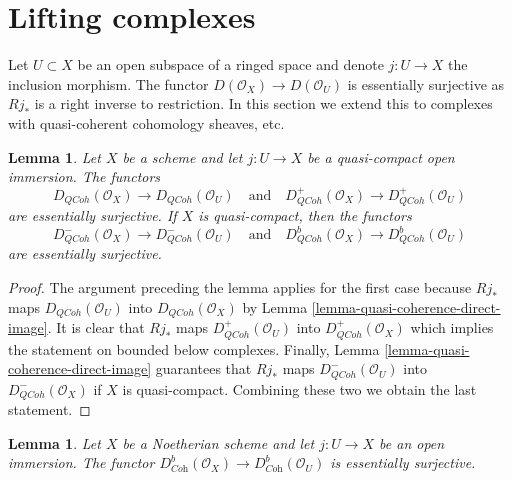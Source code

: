 \documentclass{stacks-project}
\theoremstyle{plain}
\newtheorem{lemma}[subsection]{Lemma}
\theoremstyle{definition}
\theoremstyle{remark}
\numberwithin{equation}{subsection}
\def\QCoh{\mathit{QCoh}}
\begin{document}
\section{Lifting complexes}
\label{section-lift}

\noindent
Let $U \subset X$ be an open subspace of a ringed space
and denote $j : U \to X$ the inclusion morphism. The functor
$D(\mathcal{O}_X) \to D(\mathcal{O}_U)$ is essentially surjective as
$Rj_*$ is a right inverse to restriction.
In this section we extend this to complexes with quasi-coherent cohomology
sheaves, etc.

\begin{lemma}
\label{lemma-lift-quasi-coherent}
Let $X$ be a scheme and let $j : U \to X$ be a quasi-compact
open immersion. The functors
$$
D_\QCoh(\mathcal{O}_X) \to D_\QCoh(\mathcal{O}_U)
\quad\text{and}\quad
D^+_\QCoh(\mathcal{O}_X) \to D^+_\QCoh(\mathcal{O}_U)
$$
are essentially surjective. If $X$ is quasi-compact, then the functors
$$
D^-_\QCoh(\mathcal{O}_X) \to D^-_\QCoh(\mathcal{O}_U)
\quad\text{and}\quad
D^b_\QCoh(\mathcal{O}_X) \to D^b_\QCoh(\mathcal{O}_U)
$$
are essentially surjective.
\end{lemma}

\begin{proof}
The argument preceding the lemma applies for the first case because $Rj_*$
maps $D_\QCoh(\mathcal{O}_U)$ into $D_\QCoh(\mathcal{O}_X)$
by Lemma \ref{lemma-quasi-coherence-direct-image}.
It is clear that $Rj_*$ maps
$D^+_\QCoh(\mathcal{O}_U)$ into
$D^+_\QCoh(\mathcal{O}_X)$
which implies the statement on bounded below complexes.
Finally, Lemma \ref{lemma-quasi-coherence-direct-image}
guarantees that $Rj_*$ maps
$D^-_\QCoh(\mathcal{O}_U)$ into
$D^-_\QCoh(\mathcal{O}_X)$
if $X$ is quasi-compact. Combining these two we obtain the last statement.
\end{proof}

\begin{lemma}
\label{lemma-lift-coherent}
Let $X$ be a Noetherian scheme and let $j : U \to X$ be an open immersion.
The functor
$D^b_{\textit{Coh}}(\mathcal{O}_X) \to D^b_{\textit{Coh}}(\mathcal{O}_U)$
is essentially surjective.
\end{lemma}
\end{document}
